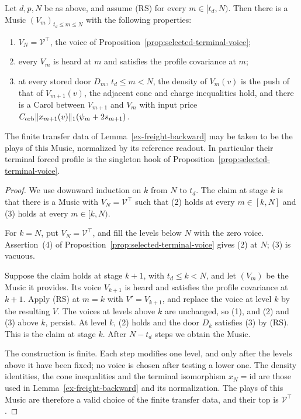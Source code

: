 \begin{proposition}
\label{prop:selected-music}
Let $d,p,N$ be as above, and assume (RS) for every $m\in[t_d,N)$. Then
there is a Music $(V_m)_{t_d\le m\le N}$ with the following properties:
\begin{enumerate}
\item $V_N=\mathcal V^\top$, the voice of
  Proposition~\ref{prop:selected-terminal-voice};
\item every $V_m$ is heard at $m$ and satisfies the profile covariance at
  $m$;
\item at every stored door $D_m$, $t_d\le m<N$, the density of $V_m(v)$
  is the push of that of $V_{m+1}(v)$, the adjacent cone and charge
  inequalities hold, and there is a Carol between $V_{m+1}$ and $V_m$
  with input price $C_{\rm orb}\|x_{m+1}(v)\|_1(\psi_m+2s_{m+1})$.
\end{enumerate}
The finite transfer data of Lemma~\ref{ex-freight-backward} may be taken
to be the plays of this Music, normalized by its reference readout. In
particular their terminal forced profile is the singleton hook of
Proposition~\ref{prop:selected-terminal-voice}.
\end{proposition}

\begin{proof}
We use downward induction on $k$ from $N$ to $t_d$. The claim at stage
$k$ is that there is a Music with $V_N=\mathcal V^\top$ such that (2)
holds at every $m\in[k,N]$ and (3) holds at every $m\in[k,N)$.

For $k=N$, put $V_N=\mathcal V^\top$, and fill the levels below $N$
with the zero voice. Assertion~(4) of
Proposition~\ref{prop:selected-terminal-voice} gives (2) at $N$; (3) is
vacuous.

Suppose the claim holds at stage $k+1$, with $t_d\le k<N$, and let
$(V_m)$ be the Music it provides. Its voice $V_{k+1}$ is heard and
satisfies the profile covariance at $k+1$. Apply (RS) at $m=k$ with
$V'=V_{k+1}$, and replace the voice at level $k$ by the resulting $V$.
The voices at levels above $k$ are unchanged, so (1), and (2) and (3)
above $k$, persist. At level $k$, (2) holds and the door $D_k$
satisfies (3) by (RS). This is the claim at stage $k$. After $N-t_d$
steps we obtain the Music.

The construction is finite. Each step modifies one level, and only
after the levels above it have been fixed; no voice is chosen after
testing a lower one. The density identities, the cone inequalities and
the terminal isomorphism $x_N=\mathrm{id}$ are those used in
Lemma~\ref{ex-freight-backward} and its normalization. The plays of
this Music are therefore a valid choice of the finite transfer data,
and their top is $\mathcal V^\top$.
\end{proof}

